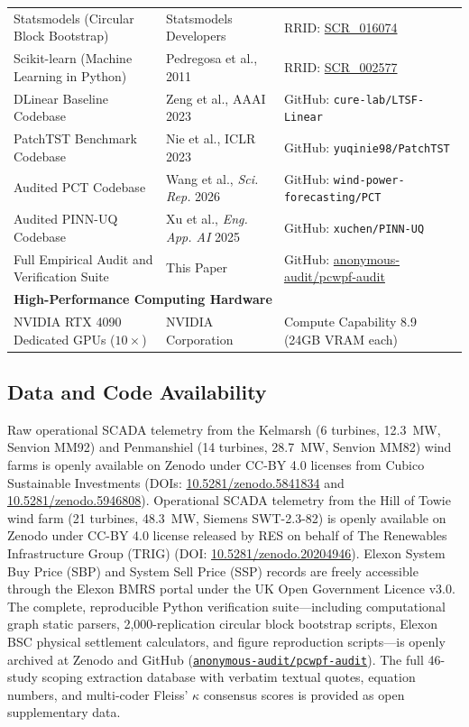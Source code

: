 \begin{table}[!h]
\begin{tabularx}{\textwidth}{p{4.0cm}p{5.5cm}>{\raggedright\arraybackslash}X}
Statsmodels (Circular Block Bootstrap) & Statsmodels Developers & RRID: \href{https://scicrunch.org/resolver/SCR_016074}{SCR\_016074} \\
Scikit-learn (Machine Learning in Python) & Pedregosa et al., 2011 & RRID: \href{https://scicrunch.org/resolver/SCR_002577}{SCR\_002577} \\
DLinear Baseline Codebase & Zeng et al., AAAI 2023 & GitHub: \texttt{cure-lab/LTSF-Linear} \\
PatchTST Benchmark Codebase & Nie et al., ICLR 2023 & GitHub: \texttt{yuqinie98/PatchTST} \\
Audited PCT Codebase & Wang et al., \textit{Sci. Rep.} 2026 & GitHub: \texttt{wind-power-forecasting/PCT} \\
Audited PINN-UQ Codebase & Xu et al., \textit{Eng. App. AI} 2025 & GitHub: \texttt{xuchen/PINN-UQ} \\
Full Empirical Audit and Verification Suite & This Paper & GitHub: \href{https://github.com/anonymous-audit/pcwpf-audit}{anonymous-audit/pcwpf-audit} \\
\midrule
\multicolumn{3}{l}{\textbf{High-Performance Computing Hardware}} \\
\midrule
NVIDIA RTX 4090 Dedicated GPUs ($10\times$) & NVIDIA Corporation & Compute Capability 8.9 (24GB VRAM each) \\
\bottomrule
\end{tabularx}
\end{table}

\subsection{Data and Code Availability}
Raw operational SCADA telemetry from the Kelmarsh (6 turbines, 12.3~MW, Senvion MM92) and Penmanshiel (14 turbines, 28.7~MW, Senvion MM82) wind farms is openly available on Zenodo under CC-BY 4.0 licenses from Cubico Sustainable Investments (DOIs: \href{https://doi.org/10.5281/zenodo.5841834}{10.5281/zenodo.5841834} and \href{https://doi.org/10.5281/zenodo.5946808}{10.5281/zenodo.5946808}). Operational SCADA telemetry from the Hill of Towie wind farm (21 turbines, 48.3~MW, Siemens SWT-2.3-82) is openly available on Zenodo under CC-BY 4.0 license released by RES on behalf of The Renewables Infrastructure Group (TRIG) (DOI: \href{https://doi.org/10.5281/zenodo.20204946}{10.5281/zenodo.20204946}). Elexon System Buy Price (SBP) and System Sell Price (SSP) records are freely accessible through the Elexon BMRS portal under the UK Open Government Licence v3.0. The complete, reproducible Python verification suite---including computational graph static parsers, 2,000-replication circular block bootstrap scripts, Elexon BSC physical settlement calculators, and figure reproduction scripts---is openly archived at Zenodo and GitHub (\href{https://github.com/anonymous-audit/pcwpf-audit}{\texttt{anonymous-audit/pcwpf-audit}}). The full 46-study scoping extraction database with verbatim textual quotes, equation numbers, and multi-coder Fleiss' $\kappa$ consensus scores is provided as open supplementary data.

